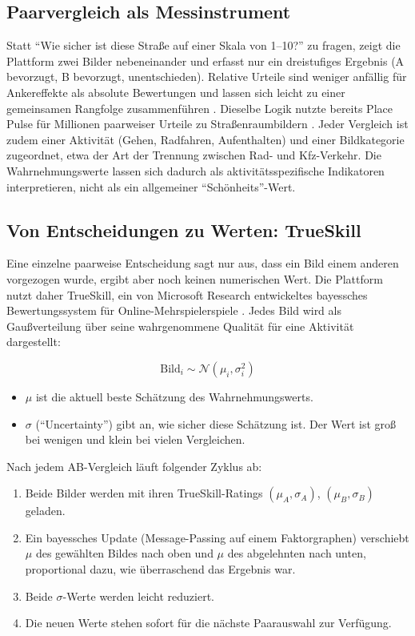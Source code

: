 \documentclass[a4paper,12pt]{article}
\begin{document}
\subsection{Paarvergleich als Messinstrument}

Statt \enquote{Wie sicher ist diese Straße auf einer Skala von 1--10?} zu fragen, zeigt die Plattform zwei Bilder nebeneinander und erfasst nur ein dreistufiges Ergebnis (A bevorzugt, B bevorzugt, unentschieden). Relative Urteile sind weniger anfällig für Ankereffekte als absolute Bewertungen und lassen sich leicht zu einer gemeinsamen Rangfolge zusammenführen \autocite{salesses2013}. Dieselbe Logik nutzte bereits Place Pulse für Millionen paarweiser Urteile zu Straßenraumbildern \autocite{salesses2013,naik2014}. Jeder Vergleich ist zudem einer Aktivität (Gehen, Radfahren, Aufenthalten) und einer Bildkategorie zugeordnet, etwa der Art der Trennung zwischen Rad- und Kfz-Verkehr. Die Wahrnehmungswerte lassen sich dadurch als aktivitätsspezifische Indikatoren interpretieren, nicht als ein allgemeiner \enquote{Schönheits}-Wert.

\subsection{Von Entscheidungen zu Werten: TrueSkill}

Eine einzelne paarweise Entscheidung sagt nur aus, dass ein Bild einem anderen vorgezogen wurde, ergibt aber noch keinen numerischen Wert. Die Plattform nutzt daher TrueSkill, ein von Microsoft Research entwickeltes bayessches Bewertungssystem für Online-Mehrspielerspiele \autocite{herbrich2007}. Jedes Bild wird als Gaußverteilung über seine wahrgenommene Qualität für eine Aktivität dargestellt:

\[
\text{Bild}_i \sim \mathcal{N}(\mu_i, \sigma_i^2)
\]

\begin{itemize}
	\item $\mu$ ist die aktuell beste Schätzung des Wahrnehmungswerts.
	\item $\sigma$ (\enquote{Uncertainty}) gibt an, wie sicher diese Schätzung ist. Der Wert ist groß bei wenigen und klein bei vielen Vergleichen.
\end{itemize}

Nach jedem AB-Vergleich läuft folgender Zyklus ab:

\begin{enumerate}
	\item Beide Bilder werden mit ihren TrueSkill-Ratings $(\mu_A,\sigma_A)$, $(\mu_B,\sigma_B)$ geladen.
	\item Ein bayessches Update (Message-Passing auf einem Faktorgraphen) verschiebt $\mu$ des gewählten Bildes nach oben und $\mu$ des abgelehnten nach unten, proportional dazu, wie überraschend das Ergebnis war.
	\item Beide $\sigma$-Werte werden leicht reduziert.
	\item Die neuen Werte stehen sofort für die nächste Paarauswahl zur Verfügung.
\end{enumerate}
\end{document}
